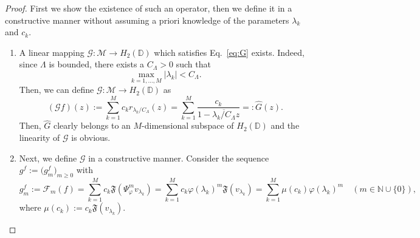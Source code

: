 \documentclass[10pt,a4paper]{amsart}
\newcommand{\cM}{\mathcal{M}}
\newcommand{\funF}{\mathfrak{F}}
\renewcommand{\hat}{\widehat}
\begin{document}
\begin{proof}
First we show the existence of such an operator, then we define it in a constructive manner without assuming a priori knowledge of the parameters $\lambda_k$ and $c_k$.
\begin{enumerate}[label = \alph*)]
\item  A linear mapping $\mathcal{G} : \cM \to H_2(\mathbb{D})$ which satisfies Eq.~\eqref{eq:G} exists. Indeed, since $\Lambda$ is bounded, there exists a $C_{\Lambda} > 0$ such that
\begin{equation}
    \label{eq:cf}
    \max_{k=1,\ldots,M}|\lambda_k| < C_{\Lambda}.
\end{equation}
Then, we can define $\mathcal{G} : \cM \to H_2(\mathbb{D})$ as
\begin{equation*}
    (\mathcal{G}f)(z) := \sum_{k=1}^{M} c_k r_{\lambda_k / C_{\Lambda}}(z) = \sum_{k=1}^{M} \frac{c_k}{1 - \overline{\lambda_k/ C_{\Lambda}}z} =: \hat{G}(z).
\end{equation*}
Then, $\hat{G}$ clearly belongs to an $M$-dimensional subspace of $H_2(\mathbb{D})$ and the linearity of $\mathcal{G}$ is obvious. 

\item Next, we define $\mathcal{G}$ in a constructive manner. %
Consider the sequence $g^f := \big(g_m^f\big)_{m \ge 0}$ with 
\begin{equation*}
    g^{f}_m := \mathcal{F}_m(f) = \sum_{k=1}^M c_k \funF( \Psi_\varphi^m v_{\lambda_k} ) = \sum_{k=1}^M c_k \varphi(\lambda_k)^m \funF( v_{\lambda_k}) = \sum_{k=1}^{M} \mu(c_k) \varphi(\lambda_k)^m\quad (m \in \mathbb{N} \cup \{0\}),
\end{equation*}
where $\mu(c_k) := c_k \funF(v_{\lambda_k})$. 


\end{enumerate}
\end{proof}
\end{document}
